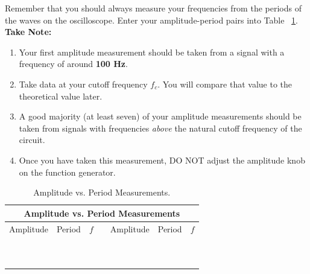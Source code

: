 Remember that you should always measure your frequencies from the periods of 
the waves on the oscilloscope.  Enter your amplitude-period pairs into
Table ~\ref{tab:RC:lowpass}.  {\bf Take Note:}
\begin{enumerate}
 \item Your first amplitude measurement should be taken from
a signal with a frequency of around {\bf 100 Hz}. 
 \item Take data at your cutoff frequency $f_c$. You will compare that value to the theoretical value later.
 \item A good majority (at least seven) of your amplitude
measurements should be taken from signals with frequencies {\it above}
the natural cutoff frequency of the circuit.
 \item Once you have taken this measurement, DO NOT adjust the amplitude knob on the function
generator.
\end{enumerate}

\begin{table}[htb]
\begin{center}
\begin{tabular}{|c|c|c|c|c|c|c|}
\hline
\multicolumn{7}{|c|}{Amplitude vs. Period Measurements} \\
\hline
Amplitude & Period & $f$ &  & Amplitude & Period & $f$ \\
\hline
\hspace*{1.5cm} & \hspace*{1.5cm} & \hspace*{1.5cm}& \hspace*{.1cm} & \hspace*{1.5cm} & \hspace*{1.5cm}& \hspace*{1.5cm} \\
& & & & & & \\
\hline
& & & & & & \\
& & & & & & \\
\hline
& & & & & & \\
& & & & & & \\
\hline
& & & & & & \\
& & & & & & \\
\hline
& & & & & & \\
& & & & & & \\
\hline

\end{tabular}
\end{center}
\caption{Amplitude vs. Period Measurements.}
\label{tab:RC:lowpass}
\end{table}


